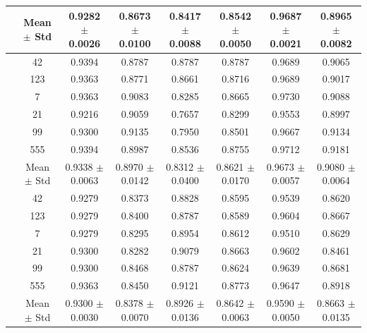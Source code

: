 \documentclass{article}
\begin{document}
\begin{table}[htbp]
{\begin{tabular}{>{\raggedright\arraybackslash}p{3.2cm}ccccccc}
			\cmidrule(lr){2-8}
			
			& Mean $\pm$ Std
			& 0.9282 $\pm$ 0.0026
			& 0.8673 $\pm$ 0.0100
			& 0.8417 $\pm$ 0.0088
			& 0.8542 $\pm$ 0.0050
			& 0.9687 $\pm$ 0.0021
			& 0.8965 $\pm$ 0.0082 \\
			
			\bottomrule
			
			\multirow{8}{*}{SBERT}
			& 42  & 0.9394 & 0.8787 & 0.8787 & 0.8787 & 0.9689 & 0.9065 \\
			& 123 & 0.9363 & 0.8771 & 0.8661 & 0.8716 & 0.9689 & 0.9017 \\
			& 7   & 0.9363 & 0.9083 & 0.8285 & 0.8665 & 0.9730 & 0.9088 \\
			& 21  & 0.9216 & 0.9059 & 0.7657 & 0.8299 & 0.9553 & 0.8997 \\
			& 99  & 0.9300 & 0.9135 & 0.7950 & 0.8501 & 0.9667 & 0.9134 \\
			& 555 & 0.9394 & 0.8987 & 0.8536 & 0.8755 & 0.9712 & 0.9181 \\
			
			\cmidrule(lr){2-8}
			
			& Mean $\pm$ Std
			& 0.9338 $\pm$ 0.0063
			& 0.8970 $\pm$ 0.0142
			& 0.8312 $\pm$ 0.0400
			& 0.8621 $\pm$ 0.0170
			& 0.9673 $\pm$ 0.0057
			& 0.9080 $\pm$ 0.0064 \\
			
			\multirow{8}{*}{RoBERTa-Large}
			& 42  & 0.9279 & 0.8373 & 0.8828 & 0.8595 & 0.9539 & 0.8620 \\
			& 123 & 0.9279 & 0.8400 & 0.8787 & 0.8589 & 0.9604 & 0.8667 \\
			& 7   & 0.9279 & 0.8295 & 0.8954 & 0.8612 & 0.9510 & 0.8629 \\
			& 21  & 0.9300 & 0.8282 & 0.9079 & 0.8663 & 0.9602 & 0.8461 \\
			& 99  & 0.9300 & 0.8468 & 0.8787 & 0.8624 & 0.9639 & 0.8681 \\
			& 555 & 0.9363 & 0.8450 & 0.9121 & 0.8773 & 0.9647 & 0.8918 \\
			
			\cmidrule(lr){2-8}
			
			& Mean $\pm$ Std
			& 0.9300 $\pm$ 0.0030
			& 0.8378 $\pm$ 0.0070
			& 0.8926 $\pm$ 0.0136
			& 0.8642 $\pm$ 0.0063
			& 0.9590 $\pm$ 0.0050
			& 0.8663 $\pm$ 0.0135 \\
			
			
		\end{tabular}%
	}
	
\end{table}
\end{document}
